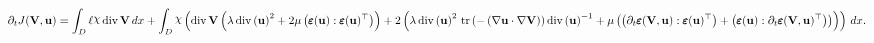 \documentclass[preview]{standalone}
\let\oldcdot\cdot
\let\cdot\oldcdot
\begin{document}
\begin{dmath*}
\partial_{t} J({\mathbf V},{\mathbf{ u }}) =  \int_{D} \ell \raisebox{\depth}{$\chi$} \operatorname{div} {\mathbf V} \,dx +  \int_{D} \raisebox{\depth}{$\chi$} \left(\operatorname{div} {\mathbf V} \left(\lambda \operatorname{div}\left( {\mathbf{ u }} \right)^{2} + 2 \mu \left( \pmb \varepsilon({\mathbf{ u }}) \mathrel{:}  \pmb \varepsilon({\mathbf{ u }})^\top  \right)\right) + 2 \left(\lambda \operatorname{div}\left( {\mathbf{ u }} \right)^{2}  \,\operatorname{tr}\left(- \left(  \nabla {\mathbf{ u }}  \cdot  \nabla {\mathbf V}  \right)\right)  \operatorname{div}\left( {\mathbf{ u }} \right)^{-1} + \mu \left(\left( \partial_{t} \pmb \varepsilon({\mathbf V},{\mathbf{ u }}) \mathrel{:}  \pmb \varepsilon({\mathbf{ u }})^\top  \right) + \left( \pmb \varepsilon({\mathbf{ u }}) \mathrel{:}  \partial_{t} \pmb \varepsilon({\mathbf V},{\mathbf{ u }})^\top  \right)\right)\right)\right) \,dx.
 \end{dmath*}
\end{document}
